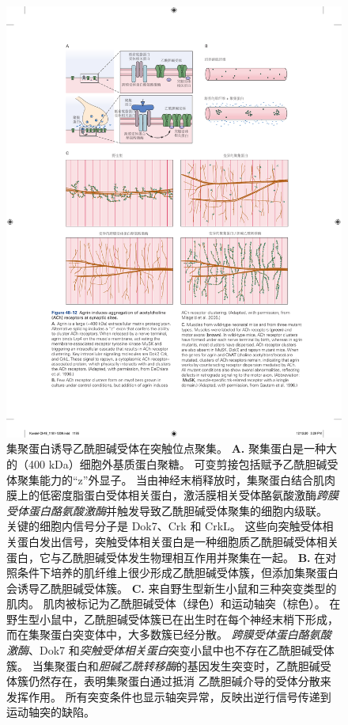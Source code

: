 \begin{figure}[htbp]
	\centering
	\includegraphics[width=1.0\linewidth]{chap48/fig_48_12}
	\caption{集聚蛋白诱导乙酰胆碱受体在突触位点聚集。
		\textbf{A.} 聚集蛋白是一种大的（400 kDa）细胞外基质蛋白聚糖。
		可变剪接包括赋予乙酰胆碱受体聚集能力的“z”外显子。
		当由神经末梢释放时，集聚蛋白结合肌肉膜上的低密度脂蛋白受体相关蛋白，激活膜相关受体酪氨酸激酶\textit{跨膜受体蛋白酪氨酸激酶}并触发导致乙酰胆碱受体聚集的细胞内级联。
		关键的细胞内信号分子是 Dok7、Crk 和 CrkL。
		这些向突触受体相关蛋白发出信号，突触受体相关蛋白是一种细胞质乙酰胆碱受体相关蛋白，它与乙酰胆碱受体发生物理相互作用并聚集在一起\cite{dechiara1996receptor}。
		\textbf{B.} 在对照条件下培养的肌纤维上很少形成乙酰胆碱受体簇，但添加集聚蛋白会诱导乙酰胆碱受体簇\cite{misgeld2005agrin}。
		\textbf{C.} 来自野生型新生小鼠和三种突变类型的肌肉。
		肌肉被标记为乙酰胆碱受体（绿色）和运动轴突（棕色）。
		在野生型小鼠中，乙酰胆碱受体簇已在出生时在每个神经末梢下形成，而在集聚蛋白突变体中，大多数簇已经分散。
		\textit{跨膜受体蛋白酪氨酸激酶}、Dok7 和\textit{突触受体相关蛋白}突变小鼠中也不存在乙酰胆碱受体簇。
		当集聚蛋白和\textit{胆碱乙酰转移酶}的基因发生突变时，乙酰胆碱受体簇仍然存在，表明集聚蛋白通过抵消 乙酰胆碱介导的受体分散来发挥作用。
		所有突变条件也显示轴突异常，反映出逆行信号传递到运动轴突的缺陷\cite{gautam1996defective}。}
	\label{fig:48_12}
\end{figure}


